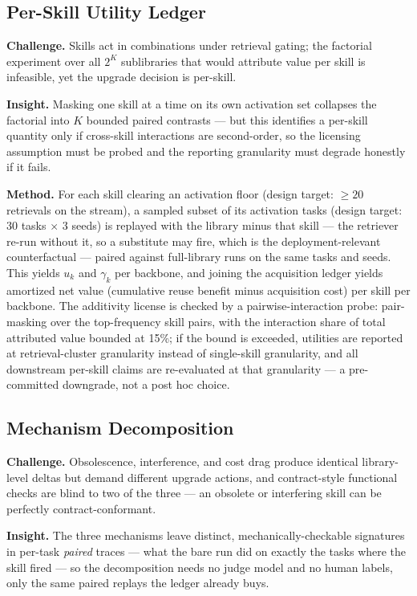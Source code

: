\documentclass[11pt]{article}
\begin{document}
\subsection{Per-Skill Utility Ledger}

\textbf{Challenge.} Skills act in combinations under retrieval gating; the factorial experiment over all $2^K$ sublibraries that would attribute value per skill is infeasible, yet the upgrade decision is per-skill.

\textbf{Insight.} Masking one skill at a time on its own activation set collapses the factorial into $K$ bounded paired contrasts --- but this identifies a per-skill quantity only if cross-skill interactions are second-order, so the licensing assumption must be probed and the reporting granularity must degrade honestly if it fails.

\textbf{Method.} For each skill clearing an activation floor (design target: $\geq 20$ retrievals on the stream), a sampled subset of its activation tasks (design target: 30 tasks $\times$ 3 seeds) is replayed with the library minus that skill --- the retriever re-run without it, so a substitute may fire, which is the deployment-relevant counterfactual --- paired against full-library runs on the same tasks and seeds. This yields $u_k$ and $\gamma_k$ per backbone, and joining the acquisition ledger yields amortized net value (cumulative reuse benefit minus acquisition cost) per skill per backbone. The additivity license is checked by a pairwise-interaction probe: pair-masking over the top-frequency skill pairs, with the interaction share of total attributed value bounded at 15\%; if the bound is exceeded, utilities are reported at retrieval-cluster granularity instead of single-skill granularity, and all downstream per-skill claims are re-evaluated at that granularity --- a pre-committed downgrade, not a post hoc choice.

\subsection{Mechanism Decomposition}

\textbf{Challenge.} Obsolescence, interference, and cost drag produce identical library-level deltas but demand different upgrade actions, and contract-style functional checks \citep{SkillGuard2026} are blind to two of the three --- an obsolete or interfering skill can be perfectly contract-conformant.

\textbf{Insight.} The three mechanisms leave distinct, mechanically-checkable signatures in per-task \emph{paired} traces --- what the bare run did on exactly the tasks where the skill fired --- so the decomposition needs no judge model and no human labels, only the same paired replays the ledger already buys.
\end{document}
